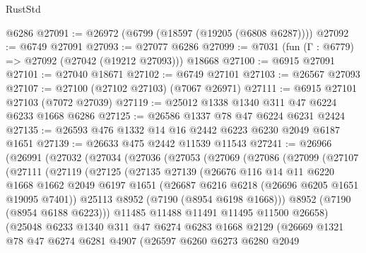 \begin{lexlean}{RustStd}
\begin{coremodule}
    @6286
@27091 := @26972 (@6799 (@18597 (@19205 (@6808 @6287))))
@27092 := @6749 @27091
@27093 := @27077 @6286
@27099 := @7031 (fun (Γ : @6779) => @27092 (@27042 (@19212 @27093))) @18668
@27100 := @6915 @27091
@27101 := @27040 @18671
@27102 := @6749 @27101
@27103 := @26567 @27093
@27107 := @27100 (@27102 @27103) (@7067 @26971)
@27111 := @6915 @27101 @27103 (@7072 @27039)
@27119 := @25012 @1338 @1340 @311 @47 @6224 @6233 @1668 @6286
@27125 := @26586 @1337 @78 @47 @6224 @6231 @2424
@27135 := @26593 @476 @1332 @14 @16 @2442 @6223 @6230 @2049 @6187 @1651
@27139 := @26633 @475 @2442 @11539 @11543
@27241 := @26966
    (@26991
      (@27032
        (@27034
          (@27036
            (@27053
              (@27069
                (@27086
                  (@27099
                    (@27107
                      (@27111
                        (@27119
                          (@27125
                            (@27135
                              @27139
                              (@26676
                                @116
                                @14
                                @11
                                @6220
                                @1668
                                @1662
                                @2049
                                @6197
                                @1651
                                (@26687 @6216 @6218 (@26696 @6205 @1651 @19095 @7401))
                                @25113
                                @8952
                                (@7190 (@8954 @6198 @1668)))
                              @8952
                              (@7190 (@8954 @6188 @6223)))
                            @11485
                            @11488
                            @11491
                            @11495
                            @11500
                            @26658)
                          (@25048
                            @6233
                            @1340
                            @311
                            @47
                            @6274
                            @6283
                            @1668
                            @2129
                            (@26669
                              @1321
                              @78
                              @47
                              @6274
                              @6281
                              @4907
                              (@26597
                                @6260
                                @6273
                                @6280
                                @2049

\end{coremodule}
\end{lexlean}
